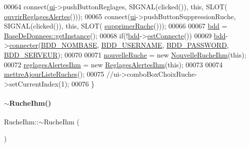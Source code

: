 \begin{DoxyCode}
00064     connect(\hyperlink{class_ruche_ihm_a64786058bd7f88ca2f1e9743bb27c25b}{ui}->pushButtonReglages, SIGNAL(clicked()), \textcolor{keyword}{this}, SLOT(
      \hyperlink{class_ruche_ihm_ab8db02641e73f348fd6162321a3765da}{ouvrirReglagesAlertes}()));
00065     connect(\hyperlink{class_ruche_ihm_a64786058bd7f88ca2f1e9743bb27c25b}{ui}->pushButtonSuppressionRuche, SIGNAL(clicked()), \textcolor{keyword}{this}, SLOT(
      \hyperlink{class_ruche_ihm_a85729b1ae4f3dfb5130eb45f5a426e3c}{supprimerRuche}()));
00066 
00067     \hyperlink{class_ruche_ihm_a0851936fe212e8d40538264f09749153}{bdd} = \hyperlink{class_base_de_donnees_a80028aa2b6b4fbf30fb2e36357b7d3d3}{BaseDeDonnees::getInstance}();
00068     \textcolor{keywordflow}{if}(!\hyperlink{class_ruche_ihm_a0851936fe212e8d40538264f09749153}{bdd}->\hyperlink{class_base_de_donnees_a00388973f3ec42e5c8e76e7af7e124b2}{estConnecte}())
00069         \hyperlink{class_ruche_ihm_a0851936fe212e8d40538264f09749153}{bdd}->\hyperlink{class_base_de_donnees_ac20da193923a9bfea5e38ee5a54820cd}{connecter}(\hyperlink{parametres_8h_a45f8f15b8f9a7ab4c2b219038ff64f6b}{BDD\_NOMBASE}, \hyperlink{parametres_8h_a88b5f5b81fa534553c68802384beff2c}{BDD\_USERNAME}, 
      \hyperlink{parametres_8h_ae2ded9166ed2553182545e97514c04f7}{BDD\_PASSWORD}, \hyperlink{parametres_8h_a423559dc987673b8aacaa9f369839bb0}{BDD\_SERVEUR});
00070 
00071     \hyperlink{class_ruche_ihm_a3a27b7af842244c6db3623f5f256bed5}{nouvelleRuche} = \textcolor{keyword}{new} \hyperlink{class_nouvelle_ruche_ihm}{NouvelleRucheIhm}(\textcolor{keyword}{this});
00072     \hyperlink{class_ruche_ihm_a04068fbec978c2443f3baf08d4945929}{reglagesAlertesIhm} = \textcolor{keyword}{new} \hyperlink{class_reglages_alertes_ihm}{ReglagesAlertesIhm}(\textcolor{keyword}{this});
00073 
00074     \hyperlink{class_ruche_ihm_a77cb005fde7e2271e8721c23cef13b3e}{mettreAjourListeRuches}();
00075     \textcolor{comment}{//ui->comboBoxChoixRuche->setCurrentIndex(1);}
00076 \}
\end{DoxyCode}
\mbox{\label{class_ruche_ihm_a4c489bf18e8c9947a375322d03504419}} 
\paragraph{\texorpdfstring{$\sim$\+Ruche\+Ihm()}{~RucheIhm()}}
{\footnotesize\ttfamily Ruche\+Ihm\+::$\sim$\+Ruche\+Ihm (\begin{DoxyParamCaption}{ }\end{DoxyParamCaption})}



